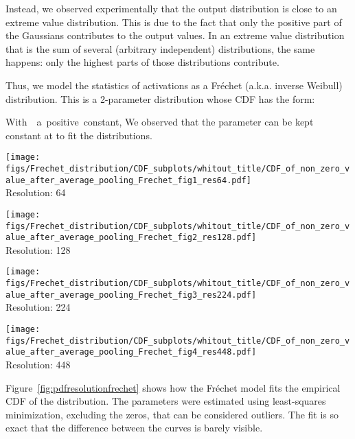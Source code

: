 Instead, we observed experimentally that the output distribution is close to an extreme value distribution. 
This is due to the fact that only the positive part of the Gaussians contributes to the output values.
In an extreme value distribution that is the sum of several (arbitrary independent) distributions, the same happens: only the highest parts of those distributions contribute. 

Thus, we model the statistics of activations as a Fr\'echet (a.k.a. inverse Weibull) distribution. 
This is a 2-parameter distribution whose CDF has the form: 

With~~a~positive~constant,  
We observed that the parameter  can be kept constant at  to fit the distributions.



\begin{figure*}[b]
\begin{minipage}{0.24\linewidth}
    \texttt{[image: figs/Frechet\_distribution/CDF\_subplots/whitout\_title/CDF\_of\_non\_zero\_value\_after\_average\_pooling\_Frechet\_fig1\_res64.pdf]}  \\
    Resolution: 64
\end{minipage}
\hfill
\begin{minipage}{0.24\linewidth}
\texttt{[image: figs/Frechet\_distribution/CDF\_subplots/whitout\_title/CDF\_of\_non\_zero\_value\_after\_average\_pooling\_Frechet\_fig2\_res128.pdf]} \\
Resolution: 128
\end{minipage}
\hfill
\begin{minipage}{0.24\linewidth}
\texttt{[image: figs/Frechet\_distribution/CDF\_subplots/whitout\_title/CDF\_of\_non\_zero\_value\_after\_average\_pooling\_Frechet\_fig3\_res224.pdf]} \\
Resolution: 224
\end{minipage}
\hfill
\begin{minipage}{0.24\linewidth}
\texttt{[image: figs/Frechet\_distribution/CDF\_subplots/whitout\_title/CDF\_of\_non\_zero\_value\_after\_average\_pooling\_Frechet\_fig4\_res448.pdf]} \\
 Resolution: 448
 \end{minipage}   
\caption{\label{fig:pdfresolutionfrechet}
    Fitting of the CDF of activations with a Fr\'echet distribution.
}
\end{figure*}

Figure~\ref{fig:pdfresolutionfrechet} shows how the Fr\'echet model fits the empirical CDF of the distribution. 
The parameters were estimated using least-squares minimization, excluding the zeros, that can be considered outliers.
The fit is so exact that the difference between the curves is barely visible.

